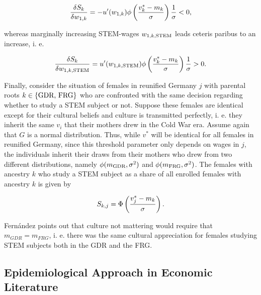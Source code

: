 \documentclass[a4paper, oneside, hyperfootnotes = false]{article}
\begin{document}
{\vspace{-8mm}

\begin{equation*}
\label{eq:derivw1k}
\frac{\delta{}S_{k}}{\delta{}w_{1,k}} = -u'(w_{1,k})\phi\left(\frac{v^{*}_{k} - m_{k}}{\sigma}\right)\frac{1}{\sigma} < 0\textnormal{,}
\end{equation*}

\noindent whereas marginally increasing STEM-wages $w_{1,k,\textnormal{STEM}}$ leads ceteris paribus to an increase, i. e.

\vspace{-8mm}

\begin{equation*}
	\label{eq:derivw1kstem}
	\frac{\delta{}S_{k}}{\delta{}w_{1,k,\textnormal{STEM}}} = u'(w_{1,k,\textnormal{STEM}})\phi\left(\frac{v^{*}_{k} - m_{k}}{\sigma}\right)\frac{1}{\sigma} > 0\textnormal{.}
\end{equation*}

Finally, consider the situation of females in reunified Germany $j$ with parental roots $k \in \{\textnormal{GDR, FRG}\}$ who are confronted with the same decision regarding whether to study a STEM subject or not. Suppose these females are identical except for their cultural beliefs and culture is transmitted perfectly, i. e. they inherit the same $v_{i}$ that their mothers drew in the Cold War era.
Assume again that $G$ is a normal distribution.
Thus, while $v^{*}$ will be identical for all females in reunified Germany, since this threshold parameter only depends on wages in $j$, the individuals inherit their draws from their mothers who drew from two different distributions, namely $\phi(m_{\textnormal{GDR}},\sigma^{2})$ and $\phi(m_{\textnormal{FRG}},\sigma^{2})$.
The females with ancestry $k$ who study a STEM subject as a share of all enrolled females with ancestry $k$ is given by

\vspace{-8mm}

\begin{equation}
	\label{eq:sharecdfancestry}
	S_{k,j} = \Phi\left(\frac{v^{*}_{j} - m_{k}}{\sigma}\right)\textnormal{.}
\end{equation}

Fernández points out that culture not mattering would require that $m_{GDR} = m_{FRG}$, i. e. there was the same cultural appreciation for females studying STEM subjects both in the GDR and the FRG.

\subsection{Epidemiological Approach in Economic Literature}
\label{epidliterature}

}
\end{document}
